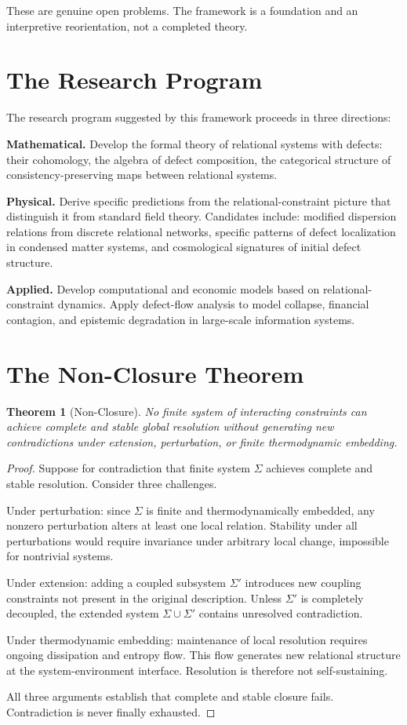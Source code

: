 \documentclass[12pt,a4paper,openany]{book}
\theoremstyle{plain}
\newtheorem{theorem}{Theorem}[chapter]
\theoremstyle{definition}
\theoremstyle{remark}
\begin{document}
These are genuine open problems. The framework is a foundation and an interpretive reorientation, not a completed theory.

\section{The Research Program}

The research program suggested by this framework proceeds in three directions:

\textbf{Mathematical.} Develop the formal theory of relational systems with defects: their cohomology, the algebra of defect composition, the categorical structure of consistency-preserving maps between relational systems.

\textbf{Physical.} Derive specific predictions from the relational-constraint picture that distinguish it from standard field theory. Candidates include: modified dispersion relations from discrete relational networks, specific patterns of defect localization in condensed matter systems, and cosmological signatures of initial defect structure.

\textbf{Applied.} Develop computational and economic models based on relational-constraint dynamics. Apply defect-flow analysis to model collapse, financial contagion, and epistemic degradation in large-scale information systems.


\section{The Non-Closure Theorem}
\label{sec:nonclosure}

\begin{theorem}[Non-Closure]
\label{thm:non_closure}
No finite system of interacting constraints can achieve complete and stable global resolution without generating new contradictions under extension, perturbation, or finite thermodynamic embedding.
\end{theorem}

\begin{proof}
Suppose for contradiction that finite system $\Sigma$ achieves complete and stable resolution. Consider three challenges.

Under perturbation: since $\Sigma$ is finite and thermodynamically embedded, any nonzero perturbation alters at least one local relation. Stability under all perturbations would require invariance under arbitrary local change, impossible for nontrivial systems.

Under extension: adding a coupled subsystem $\Sigma'$ introduces new coupling constraints not present in the original description. Unless $\Sigma'$ is completely decoupled, the extended system $\Sigma \cup \Sigma'$ contains unresolved contradiction.

Under thermodynamic embedding: maintenance of local resolution requires ongoing dissipation and entropy flow. This flow generates new relational structure at the system-environment interface. Resolution is therefore not self-sustaining.

All three arguments establish that complete and stable closure fails. Contradiction is never finally exhausted.
\end{proof}
\end{document}
